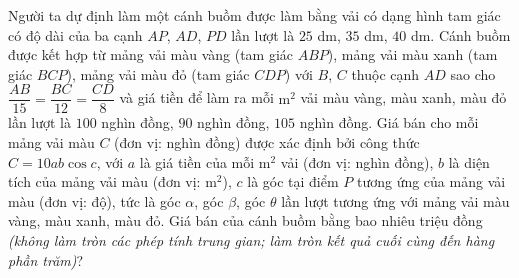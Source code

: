 \begin{ex}
Người ta dự định làm một cánh buồm được làm bằng vải có dạng hình tam giác có độ dài của ba cạnh $AP$, $AD$, $PD$ lần lượt là $25$ dm, $35$ dm, $40$ dm. Cánh buồm được kết hợp từ mảng vải màu vàng (tam giác $ABP$), mảng vải màu xanh (tam giác $BCP$), mảng vải màu đỏ (tam giác $CDP$) với $B$, $C$ thuộc cạnh $AD$ sao cho $\dfrac{AB}{15}=\dfrac{BC}{12}=\dfrac{CD}8$ và giá tiền để làm ra mỗi $\mathrm m^2$ vải màu vàng, màu xanh, màu đỏ lần lượt là $100$ nghìn đồng, $90$ nghìn đồng, $105$ nghìn đồng. Giá bán cho mỗi mảng vải màu $C$ (đơn vị: nghìn đồng) được xác định bởi công thức $C=10ab\cos c$, với $a$ là giá tiền của mỗi $\mathrm m^2$ vải (đơn vị: nghìn đồng), $b$ là diện tích của mảng vải màu (đơn vị: $\mathrm m^2$), $c$ là góc tại điểm $P$ tương ứng của mảng vải màu (đơn vị: độ), tức là góc $\alpha$, góc $\beta$, góc $\theta$ lần lượt tương ứng với mảng vải màu vàng, màu xanh, màu đỏ. Giá bán của cánh buồm bằng bao nhiêu triệu đồng \textit{(không làm tròn các phép tính trung gian; làm tròn kết quả cuối cùng đến hàng phần trăm)}?
\begin{center}
\end{center}
\end{ex}
